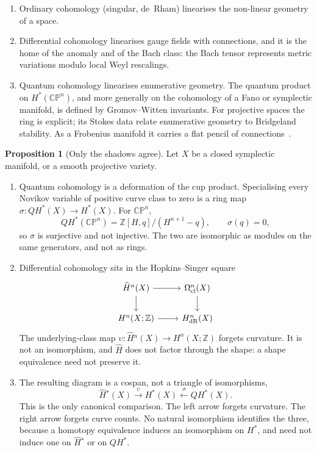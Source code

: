\documentclass{article}
\theoremstyle{definition}
\newtheorem{proposition}{Proposition}
\newcommand{\CP}{\mathbb{CP}}
\begin{document}
\begin{enumerate}[label=\arabic*.]
  \item Ordinary cohomology (singular, de~Rham) linearises the non-linear
        geometry of a space.
  \item Differential cohomology linearises gauge fields with connections,
        and it is the home of the anomaly and of the Bach class: the Bach
        tensor represents metric variations modulo local Weyl rescalings.
  \item Quantum cohomology linearises enumerative geometry.  The quantum
        product on \(H^*(\CP^n)\), and more generally on the cohomology of a
        Fano or symplectic manifold, is defined by Gromov--Witten invariants.
        For projective spaces the ring is explicit; its Stokes data relate
        enumerative geometry to Bridgeland stability.  As a Frobenius manifold
        it carries a flat pencil of connections~\cite{Dubrovin,CoatesCorti}.
\end{enumerate}

\begin{proposition}[Only the shadows agree]
\label{prop:cospan}
Let \(X\) be a closed symplectic manifold, or a smooth projective variety.
\begin{enumerate}[label=\roman*.]
  \item Quantum cohomology is a deformation of the cup product.  Specialising
        every Novikov variable of positive curve class to zero is a ring map
        \(\sigma\colon QH^*(X)\to H^*(X)\).  For \(\CP^n\),
        \[
          QH^*(\CP^n)=\mathbb{Z}[H,q]/(H^{n+1}-q),
          \qquad \sigma(q)=0,
        \]
        so \(\sigma\) is surjective and not injective.  The two are isomorphic
        as modules on the same generators, and not as rings.
  \item Differential cohomology sits in the Hopkins--Singer square
        \[
        \begin{tikzcd}
          \widehat{H}{}^n(X) \ar[r] \ar[d] &
            \Omega^n_{\mathrm{cl}}(X) \ar[d] \\
          H^n(X;\mathbb{Z}) \ar[r] &
            H^n_{\mathrm{dR}}(X)
        \end{tikzcd}
        \]
        The underlying-class map \(\upsilon\colon\widehat{H}{}^n(X)\to H^n(X;\mathbb{Z})\)
        forgets curvature.  It is not an isomorphism, and \(\widehat{H}\) does
        not factor through the shape: a shape equivalence need not preserve it.
  \item The resulting diagram is a cospan, not a triangle of isomorphisms,
        \[
          \widehat{H}{}^*(X)
            \xrightarrow{\;\upsilon\;}
          H^*(X)
            \xleftarrow{\;\sigma\;}
          QH^*(X).
        \]
        This is the only canonical comparison.  The left arrow forgets
        curvature.  The right arrow forgets curve counts.  No natural
        isomorphism identifies the three, because a homotopy equivalence
        induces an isomorphism on \(H^*\), and need not induce one on
        \(\widehat{H}{}^*\) or on \(QH^*\).
\end{enumerate}
\end{proposition}
\end{document}
